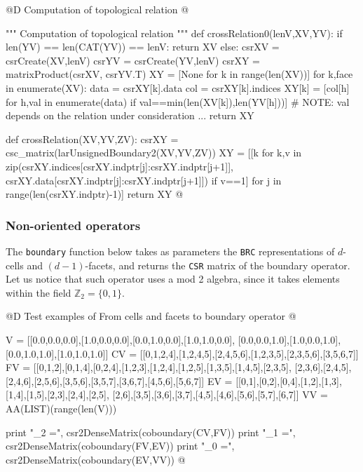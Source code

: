 \documentclass[11pt,oneside]{article}    %
\def\Z{\mathbb{Z}}
\begin{document}
@D Computation of topological relation
@{""" Computation of topological relation """
def crossRelation0(lenV,XV,YV):
    if len(YV) == len(CAT(YV)) == lenV:  
        return XV
    else:
        csrXV = csrCreate(XV,lenV)
        csrYV = csrCreate(YV,lenV)
        csrXY = matrixProduct(csrXV, csrYV.T)
        XY = [None for k in range(len(XV))]
        for k,face in enumerate(XV):
            data = csrXY[k].data
            col = csrXY[k].indices
            XY[k] = [col[h] for h,val in enumerate(data) if val==min(len(XV[k]),len(YV[h]))]
            # NOTE: val depends on the relation under consideration ...
        return XY

def crossRelation(XV,YV,ZV):
    csrXY = csc_matrix(larUnsignedBoundary2(XV,YV,ZV))
    XY = [[k for k,v in  zip(csrXY.indices[csrXY.indptr[j]:csrXY.indptr[j+1]],
			  csrXY.data[csrXY.indptr[j]:csrXY.indptr[j+1]]) if v==1]
          for j in range(len(csrXY.indptr)-1)]
    return XY
@}


\subsubsection{Non-oriented operators}

The \texttt{boundary} function below takes as parameters the \texttt{BRC} representations of $d$-cells and $(d-1)$-facets, and returns the \texttt{CSR} matrix of the boundary operator. Let us notice that such operator uses a mod 2 algebra, since it takes elements within the field $\Z_2=\{0,1\}$.

@D Test examples of From cells and facets to boundary operator
@{V = [[0.0,0.0,0.0],[1.0,0.0,0.0],[0.0,1.0,0.0],[1.0,1.0,0.0],
       [0.0,0.0,1.0],[1.0,0.0,1.0],[0.0,1.0,1.0],[1.0,1.0,1.0]]
CV = [[0,1,2,4],[1,2,4,5],[2,4,5,6],[1,2,3,5],[2,3,5,6],[3,5,6,7]]
FV = [[0,1,2],[0,1,4],[0,2,4],[1,2,3],[1,2,4],[1,2,5],[1,3,5],[1,4,5],[2,3,5],
      [2,3,6],[2,4,5],[2,4,6],[2,5,6],[3,5,6],[3,5,7],[3,6,7],[4,5,6],[5,6,7]]
EV = [[0,1],[0,2],[0,4],[1,2],[1,3],[1,4],[1,5],[2,3],[2,4],[2,5],
      [2,6],[3,5],[3,6],[3,7],[4,5],[4,6],[5,6],[5,7],[6,7]]
VV = AA(LIST)(range(len(V)))

print "\ncoboundary_2 =\n", csr2DenseMatrix(coboundary(CV,FV))
print "\ncoboundary_1 =\n", csr2DenseMatrix(coboundary(FV,EV))
print "\ncoboundary_0 =\n", csr2DenseMatrix(coboundary(EV,VV))
@}
\end{document}
